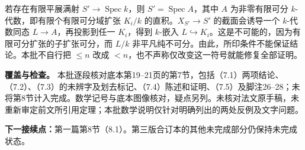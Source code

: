 \documentclass{ctexbook}
\newcommand{\Spec}{\operatorname{Spec}}
\begin{document}
若存在有限平展满射 $S'\to\Spec k$，则 $S'=\Spec A$，其中 $A$ 为非零有限可分 $k$-代数，即有限个有限可分域扩张 $K_i/k$ 的直积。$X_{S'}\to S'$ 的截面会诱导一个 $k$-代数同态 $L\to A$，再投影到任一 $K_i$，得到 $k$-嵌入 $L\hookrightarrow K_i$。这是不可能的，因为有限可分扩张的子扩张可分，而 $L/k$ 非平凡纯不可分。由此，所印条件不能保证结论。本批不自行把 $\leq n$ 改成 $<n$，也不声称仅改变这一符号就能修复全部证明。

\bigskip
\noindent\textbf{覆盖与检查。}
本批逐段核对底本第19--21页的第7节，包括（7.1）两项结论、（7.2）、（7.3）的未辨字及划去标记、（7.4）陈述和证明、（7.5）及脚注26--28；未将第8节计入完成。数学记号与底本图像核对，疑点另列。未核对法文原手稿，未重新审定前文所引用定理；本批数学说明仅针对明确列出的两处反例及文字问题。

\bigskip
\noindent\textbf{下一接续点：}第一篇第8节（8.1）。第三版合订本的其他未完成部分仍保持未完成状态。
\end{document}
